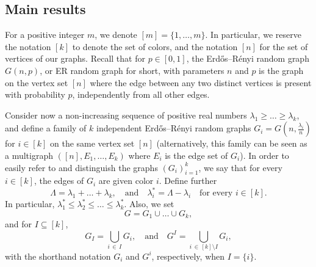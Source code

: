 \documentclass[AHL,Unicode,longabstracts,published]{cedram}
\begin{document}
\subsection{Main results}

For a positive integer $m$, we denote $[m] = \{1,\ldots,m\}$. In particular, we reserve the notation $[k]$ to denote the set of colors, and the notation $[n]$ for the set of vertices of our graphs. Recall that for $p\in [0,1]$, the Erd\H{o}s--Rényi random graph $G(n,p)$, or ER random graph for short, with parameters $n$ and $p$ is the graph on the vertex set $[n]$ where the edge between any two distinct vertices is present with probability $p$, independently from all other edges.

Consider now a non-increasing sequence of positive real numbers $\lambda_1\ge \dots \ge \lambda_k$, and define a family of $k$ independent Erd\H{o}s--Rényi random graphs $G_i= G(n,\tfrac{\lambda_i}{n})$ for $i\in [k]$ on the same vertex set $[n]$ (alternatively, this family can be seen as a multigraph $([n],E_1,\dots,E_k)$ where $E_i$ is the edge set of $G_i$). In order to easily refer to and distinguish the graphs $(G_i)_{i=1}^k$, we say that for every $i\in [k]$, the edges of $G_i$ are given color $i$. Define further
\[
\Lambda = \lambda_1 + \dots +\lambda_k,\quad \text{and}\quad
\lambda_i^* = \Lambda - \lambda_i \quad \text{for every }i\in[k].
\]
In particular, $\lambda_1^* \le \lambda_2^*\le \dots \le \lambda_k^*$. Also, we set
\begin{equation}\label{eq:defG}
G = G_1\cup \ldots\cup G_k,
\end{equation}
and for $I\subseteq [k]$,
\[
G_I= \bigcup_{i\,\in\,I} G_i, \quad \text{and}\quad G^I = \bigcup_{i\,\in\,[k]\setminus I} G_i,
\]
with the shorthand notation $G_i$ and $G^i$, respectively, when $I=\{i\}$.
\end{document}
